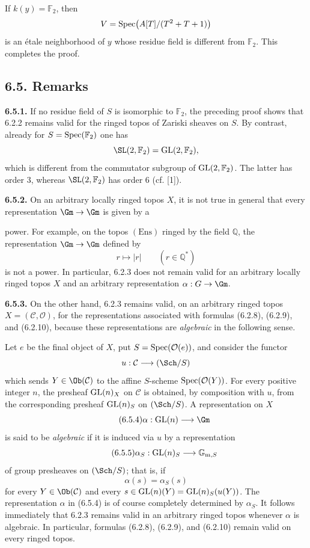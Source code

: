 If $k(y)=\mathbb F_2$, then
\[
V=\operatorname{Spec}\bigl(A[T]/(T^2+T+1)\bigr)
\]
is an \'etale neighborhood of $y$ whose residue field is different from
$\mathbb F_2$. This completes the proof.

\subsection*{6.5. Remarks}
\textbf{6.5.1.}
If no residue field of $S$ is isomorphic to $\mathbb F_2$, the preceding
proof shows that 6.2.2 remains valid for the ringed topos of Zariski sheaves
on $S$. By contrast, already for $S=\operatorname{Spec}(\mathbb F_2)$ one has
\[
\SL(2,\mathbb F_2)=\GL(2,\mathbb F_2),
\]
which is different from the commutator subgroup of
$\operatorname{GL}(2,\mathbb F_2)$. The latter has order $3$, whereas
$\SL(2,\mathbb F_2)$ has order $6$ (cf. [1]).

\textbf{6.5.2.}
On an arbitrary locally ringed topos $X$, it is not true in general that
every representation $\Gm\to\Gm$ is given by a

power. For example, on the topos $(\mathrm{Ens})$ ringed by the field
$\mathbb Q$, the representation $\Gm\to\Gm$ defined by
\[
r\longmapsto |r|\qquad(r\in\mathbb Q^*)
\]
is not a power. In particular, 6.2.3 does not remain valid for an arbitrary
locally ringed topos $X$ and an arbitrary representation
$\alpha:G\to\Gm$.

\textbf{6.5.3.}
On the other hand, 6.2.3 remains valid, on an arbitrary ringed topos
$X=(\mathcal C,\mathcal O)$, for the representations associated with
formulas (6.2.8), (6.2.9), and (6.2.10), because these representations are
\emph{algebraic} in the following sense.

Let $e$ be the final object of $X$, put
$S=\operatorname{Spec}(\mathcal O(e))$, and consider the functor
\[
u:\mathcal C\longrightarrow(\Sch/S)
\]
which sends $Y\in\Ob(\mathcal C)$ to the affine $S$-scheme
$\operatorname{Spec}(\mathcal O(Y))$. For every positive integer $n$, the presheaf
$\operatorname{GL}(n)_X$ on $\mathcal C$ is obtained, by composition with $u$, from the
corresponding presheaf $\operatorname{GL}(n)_S$ on $(\Sch/S)$. A representation on $X$
\begin{equation}\tag{6.5.4}
\alpha:\GL(n)\longrightarrow\Gm
\end{equation}
is said to be \emph{algebraic} if it is induced via $u$ by a representation
\begin{equation}\tag{6.5.5}
\alpha_S:\operatorname{GL}(n)_S\longrightarrow\mathbb G_{\mathrm m,S}
\end{equation}
of group presheaves on $(\Sch/S)$; that is, if
\[
\alpha(s)=\alpha_S(s)
\]
for every $Y\in\Ob(\mathcal C)$ and every
$s\in\operatorname{GL}(n)(Y)=\operatorname{GL}(n)_S(u(Y))$. The representation $\alpha$ in (6.5.4) is
of course completely determined by $\alpha_S$. It follows immediately that
6.2.3 remains valid in an arbitrary ringed topos whenever $\alpha$ is
algebraic. In particular, formulas (6.2.8), (6.2.9), and (6.2.10) remain
valid on every ringed topos.

